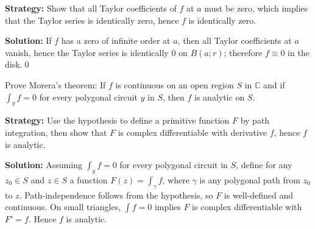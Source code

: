 \noindent\textbf{Strategy:} Show that all Taylor coefficients of \( f \) at \( a \) must be zero, which implies that the Taylor series is identically zero, hence \( f \) is identically zero.

\bigskip\noindent\textbf{Solution:}
If $f$ has a zero of infinite order at $a$, then all Taylor coefficients at $a$ vanish, hence the Taylor series is identically $0$ on $B(a;r)$; therefore $f\equiv0$ in the disk.\qed


\begin{problembox}
Prove Morera's theorem: If \( f \) is continuous on an open region \( S \) in \( \mathbb{C} \) and if \( \int_y f = 0 \) for every polygonal circuit \( y \) in \( S \), then \( f \) is analytic on \( S \).
\end{problembox}

\noindent\textbf{Strategy:} Use the hypothesis to define a primitive function \( F \) by path integration, then show that \( F \) is complex differentiable with derivative \( f \), hence \( f \) is analytic.

\bigskip\noindent\textbf{Solution:}
Assuming $\int_y f=0$ for every polygonal circuit in $S$, define for any $z_0\in S$ and $z\in S$ a function $F(z)=\int_{\gamma} f$, where $\gamma$ is any polygonal path from $z_0$ to $z$. Path-independence follows from the hypothesis, so $F$ is well-defined and continuous. On small triangles, $\int f=0$ implies $F$ is complex differentiable with $F'=f$. Hence $f$ is analytic.
